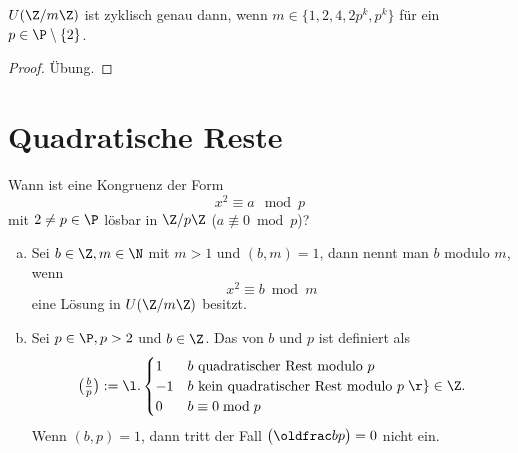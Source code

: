 \begin{kor} \label{2.12}
	$U(\Z / m\Z)$ ist zyklisch genau dann, wenn $m \in \{1, 2, 4, 2p^k, p^k \}$ für ein $p \in \P \setminus \{2\}$.
	\begin{proof}
		Übung.
		\Exercise
	\end{proof}
\end{kor}

\section{Quadratische Reste}

Wann ist eine Kongruenz der Form
\[
	x^2 \equiv a \mod p
\]
mit $2 \neq p \in \P$ lösbar in $\Z / p\Z$ ($a \not\equiv 0 \bmod p$)?

\begin{df} \label{2.13}
	\begin{enumerate}[a)]
		\item
		Sei $b \in \Z, m \in \N$ mit $m > 1$ und $(b, m) = 1$, dann nennt man $b$  modulo $m$, wenn
		\[
			x^2 \equiv b \bmod m
		\]
		eine Lösung in $U(\Z / m\Z)$ besitzt.
		\item
			Sei $p \in \P, p > 2$ und $b \in \Z$.
			Das  von $b$ und $p$ ist definiert als
			\[
				\legsym bp := \l.\begin{cases}
					1 & \text{$b$ quadratischer Rest modulo $p$} \\
					-1 & \text{$b$ kein quadratischer Rest modulo $p$} \\
					0 & \text{$b \equiv 0 \bmod p$}
				\end{cases}\r\}
				\in \Z.
			\]
			Wenn $(b, p) = 1$, dann tritt der Fall $\legsym bp = 0$ nicht ein.
	\end{enumerate}
\end{df}


